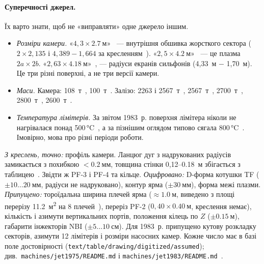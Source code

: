 \paragraph{Суперечності джерел.} Їх варто знати, щоб не «виправляти» одне джерело іншим.
\begin{itemize}
\item \emph{Розміри камери.} «$4{,}3\times\SI{2,7}{м}$»~\cite[с.~23]{JETJU1983} --- внутрішня обшивка жорсткого сектора ($2\times2{,}135$ і $4{,}389-1{,}664$ за кресленням~\cite[с.~298]{JET1975}). «$2{,}5\times\SI{4,2}{м}$»~\cite[с.~12]{JETJU1983} --- це плазма $2a\times2b$. «$2{,}63\times\SI{4,18}{м}$»~\cite[с.~310]{JET1975}, \cite[с.~13]{JETBrochure1982} --- радіуси екранів сильфонів (4,33~м $-$ 1,70~м). Це три різні поверхні, а не три версії камери.
\item \emph{Маси.} Камера: 108~т~\cite[с.~13]{JETJU1983}, 100~т~\cite[с.~6]{JETBrochure1982}. Залізо: 2263 і 2567~т~\cite[с.~415]{JET1975}, 2567~т~\cite[с.~15]{JETJU1979}, 2700~т~\cite[с.~18]{JETBrochure1982}, 2800~т~\cite[с.~13]{JETJU1983}, 2600~т~\cite[с.~42]{Wesson1999}.
\item \emph{Температура лімітерів.} За звітом 1983~р. поверхня лімітера ніколи не нагрівалася понад 500\,°C~\cite[с.~39]{JETJU1983}, а за пізнішим оглядом типово сягала 800\,°C~\cite[с.~135]{Wesson1999}. Імовірно, мова про різні періоди роботи.
\end{itemize}

\begin{projmodel}\sloppy
\emph{З креслень, точно:} профіль камери. Ланцюг дуг з надрукованих радіусів замикається з похибкою $<\SI{0,2}{мм}$, товщина стінки 0,12--\SI{0,18}{м} збігається з таблицею~\cite[с.~298, 310]{JET1975}. Звідти ж PF-3 і PF-4 та кільце. \emph{Оцифровано:} D-форма котушки TF ($\pm10\ldots\SI{20}{мм}$, радіуси не надруковано), контур ярма ($\pm\SI{30}{мм}$), форма межі плазми. \emph{Припущено:} тороїдальна ширина плечей ярма ($\approx\SI{1,0}{м}$, виведено з площі перерізу \SI{11,2}{м^2} на 8 плечей~\cite[с.~412]{JET1975}), переріз PF-2 ($0{,}40\times\SI{0,40}{м}$, креслення немає), кількість і азимути вертикальних портів, положення кілець по $Z$ ($\pm\SI{0,15}{м}$), габарити інжекторів NBI ($\pm5\ldots\SI{10}{см}$). Для 1983~р. припущено кутову розкладку секторів, азимути 12 лімітерів і розміри насосних камер. Кожне число має в базі поле достовірності (\texttt{text/table/drawing/digitized/assumed}); див.\ \texttt{machines/jet1975/README.md} і \texttt{machines/jet1983/README.md}~\cite{ProjJET}.
\end{projmodel}

